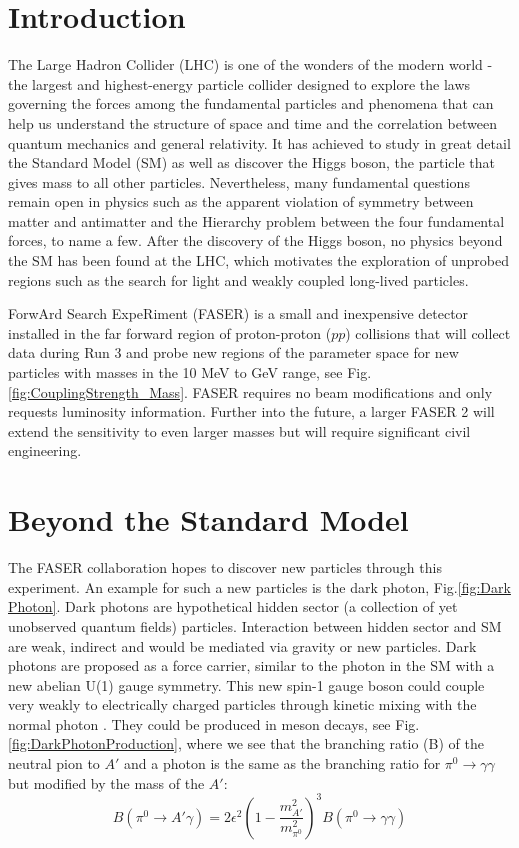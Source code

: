 \section{Introduction} %

The Large Hadron Collider (LHC) is one of the wonders of the modern world - the largest and highest-energy particle collider designed to explore the laws governing the forces among the fundamental particles and phenomena that can help us understand the structure of space and time and the correlation between quantum mechanics and general relativity. It has achieved to study in great detail the Standard Model (SM) as well as discover the Higgs boson, the particle that gives mass to all other particles. Nevertheless, many fundamental questions remain open in physics such as the apparent violation of symmetry between matter and antimatter and the Hierarchy problem between the four fundamental forces, to name a few.
After the discovery of the Higgs boson, no physics beyond the SM has been found at the LHC, which motivates the exploration of unprobed regions such as the search for light and weakly coupled long-lived particles.

ForwArd Search ExpeRiment (FASER) is a small and inexpensive detector installed in the far forward region of proton-proton ($pp$) collisions that will collect data during Run 3 and probe new regions of the parameter space for new particles with masses in the 10 MeV to GeV range, see Fig. \ref{fig:CouplingStrength_Mass}.
FASER requires no beam modifications and only requests luminosity  information. Further into the future, a larger
 FASER 2 will extend the sensitivity to even larger masses but will require significant civil engineering.

\section{Beyond the Standard Model}

The FASER collaboration hopes to discover new particles through this experiment. An example for such a new particles is the dark photon, Fig.\ref{fig:Dark Photon}. Dark photons are hypothetical hidden sector (a collection of yet unobserved quantum fields) particles. Interaction between hidden sector and SM are weak, indirect and would be mediated via gravity or new particles. Dark photons are proposed as a force carrier, similar to the photon in the SM with a new abelian U(1) gauge symmetry. This new spin-1 gauge boson could couple very weakly to electrically charged particles through kinetic mixing with the normal photon \cite{noauthor_dark_2019}.
They could be produced in meson decays, see Fig. \ref{fig:DarkPhotonProduction}, where we see that the branching ratio (B) of the neutral pion to $A'$ and a photon is the same as the branching ratio for $\pi^0 \rightarrow \gamma\gamma$ but modified by the mass of  the $A'$:
\[
B(\pi^0 \rightarrow A'\gamma)=2\epsilon^2\left( 1-\frac{m^2_{A'}}{m^2_{\pi^0}} \right)^3B(\pi^0 \rightarrow \gamma\gamma)
\]

